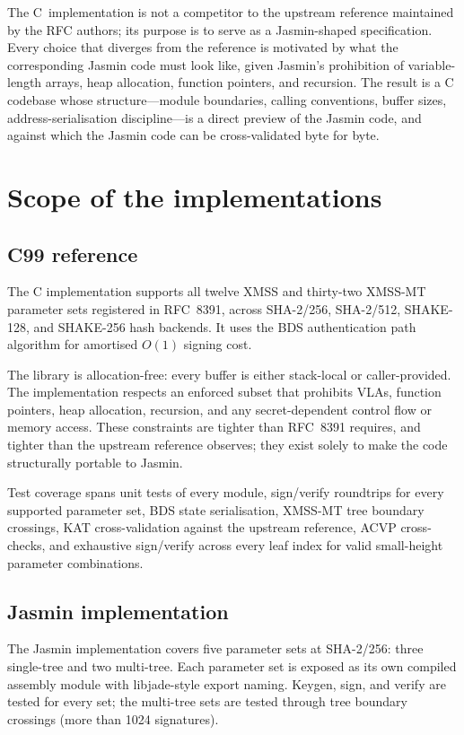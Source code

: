 \documentclass[11pt,a4paper]{article}
\begin{document}
The C~implementation is not a competitor to the upstream reference
maintained by the RFC authors; its purpose is to serve as a
Jasmin-shaped specification. Every choice that diverges from the
reference is motivated by what the corresponding Jasmin code must
look like, given Jasmin's prohibition of variable-length arrays,
heap allocation, function pointers, and recursion. The result is a
C codebase whose structure---module boundaries, calling conventions,
buffer sizes, address-serialisation discipline---is a direct preview
of the Jasmin code, and against which the Jasmin code can be
cross-validated byte for byte.

\section{Scope of the implementations}

\subsection{C99 reference}

The C implementation supports all twelve XMSS and thirty-two XMSS-MT
parameter sets registered in RFC~8391, across SHA-2/256, SHA-2/512,
SHAKE-128, and SHAKE-256 hash backends. It uses the BDS authentication
path algorithm \cite{BDS09} for amortised $O(1)$ signing cost.

The library is allocation-free: every buffer is either stack-local
or caller-provided. The implementation respects an enforced subset
that prohibits VLAs, function pointers, heap allocation, recursion,
and any secret-dependent control flow or memory access. These
constraints are tighter than RFC~8391 requires, and tighter than the
upstream reference observes; they exist solely to make the code
structurally portable to Jasmin.

Test coverage spans unit tests of every module, sign/verify
roundtrips for every supported parameter set, BDS state
serialisation, XMSS-MT tree boundary crossings, KAT cross-validation
against the upstream reference, ACVP cross-checks, and exhaustive
sign/verify across every leaf index for valid small-height
parameter combinations.

\subsection{Jasmin implementation}

The Jasmin implementation covers five parameter sets at SHA-2/256:
three single-tree and two multi-tree. Each parameter set is exposed
as its own compiled assembly module with libjade-style export
naming. Keygen, sign, and verify are tested for every set; the
multi-tree sets are tested through tree boundary crossings (more
than 1024 signatures).
\end{document}
